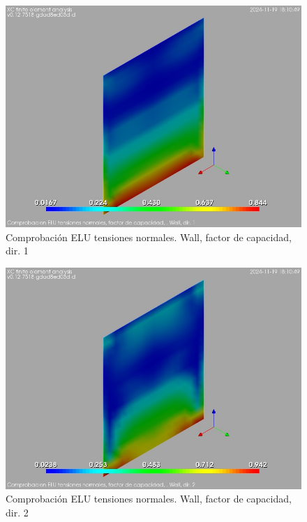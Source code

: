 \begin{figure}[ht]
\begin{center}
\includegraphics[width=\linewidth]{results/graphics/normStrsULS/wallCFSect1}
\caption{Comprobación ELU tensiones normales. Wall, factor de capacidad, dir. 1}
\label{ULS_normalStressesResistancewallCFSect1}
\end{center}
\end{figure}
\begin{figure}[ht]
\begin{center}
\includegraphics[width=\linewidth]{results/graphics/normStrsULS/wallCFSect2}
\caption{Comprobación ELU tensiones normales. Wall, factor de capacidad, dir. 2}
\label{ULS_normalStressesResistancewallCFSect2}
\end{center}
\end{figure}
